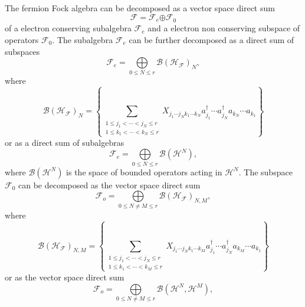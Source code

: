 \documentclass[aps,preprint,amsfonts,amssymb,showpacs,showkeys]{revtex4}%
\begin{document}
The fermion Fock algebra can be decomposed as a vector space direct sum%
\begin{equation}
\mathcal{F=F}_{e}\mathcal{\oplus F}_{0}%
\end{equation}
of a electron conserving subalgebra $\mathcal{F}_{e}$ and a electron non
conserving subspace of operators $\mathcal{F}_{0}$. The subalgebra
$\mathcal{F}_{e}$ can be further decomposed as a direct sum of subspaces
\begin{equation}
\mathcal{F}_{e}=%
{\displaystyle\bigoplus\limits_{0\leq N\leq r}}
\mathcal{B}\left(  \mathcal{H}_{\mathcal{F}}\right)  _{N}, \label{evenvect}%
\end{equation}
where
\begin{equation}
\mathcal{B}\left(  \mathcal{H}_{\mathcal{F}}\right)  _{N}=\left\{
\sum_{\substack{1\leq j_{1}<\cdots<j_{N}\leq r\\1\leq k_{1}<\cdots<k_{N}\leq
r}}X_{j_{1}\cdots j_{N}k_{1}\cdots k_{N}}a_{j_{1}}^{\dagger}\cdots a_{j_{N}%
}^{\dagger}a_{k_{N}}\cdots a_{k_{1}}\right\}
\end{equation}
or as a direct sum of subalgebras
\begin{equation}
\mathcal{F}_{e}=%
{\displaystyle\bigoplus\limits_{0\leq N\leq r}}
\mathcal{B}\left(  \mathcal{H}^{N}\right)  , \label{evenalg}%
\end{equation}
where $\mathcal{B}\left(  \mathcal{H}^{N}\right)  $ is the space of bounded
operators acting in $\mathcal{H}^{N}.$ The subspace $\mathcal{F}_{0}$ can be
decomposed as the vector space direct sum
\begin{equation}
\mathcal{F}_{o}=%
{\displaystyle\bigoplus\limits_{0\leq N\neq M\leq r}}
\mathcal{B}\left(  \mathcal{H}_{\mathcal{F}}\right)  _{N,M}, \label{oddsecond}%
\end{equation}
where
\begin{equation}
\mathcal{B}\left(  \mathcal{H}_{\mathcal{F}}\right)  _{N,M}=\left\{
\sum_{\substack{1\leq j_{1}<\cdots<j_{N}\leq r\\1\leq k_{1}<\cdots<k_{M}\leq
r}}X_{j_{1}\cdots j_{N}k_{1}\cdots k_{M}}a_{j_{1}}^{\dagger}\cdots a_{j_{N}%
}^{\dagger}a_{k_{M}}\cdots a_{k_{1}}\right\}
\end{equation}
or as the vector space direct sum
\begin{equation}
\mathcal{F}_{o}=%
{\displaystyle\bigoplus\limits_{0\leq N\neq M\leq r}}
\mathcal{B}\left(  \mathcal{H}^{N},\mathcal{H}^{M}\right)  , \label{oddfirst}%
\end{equation}
\end{document}
